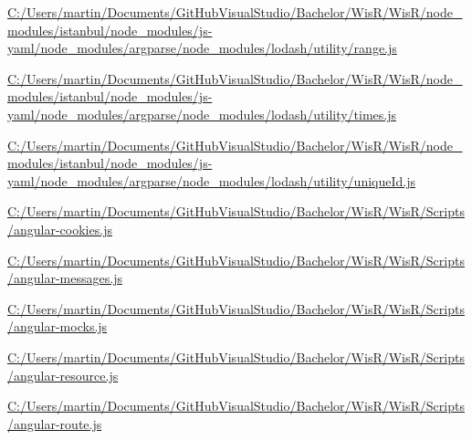 \begin{DoxyCompactItemize}
\item 
\hyperlink{_c_1_2_users_2martin_2_documents_2_git_hub_visual_studio_2_bachelor_2_wis_r_2_wis_r_2node_module2ee5492b139b46c7128e2f7da891638a}{C\+:/\+Users/martin/\+Documents/\+Git\+Hub\+Visual\+Studio/\+Bachelor/\+Wis\+R/\+Wis\+R/node\+\_\+modules/istanbul/node\+\_\+modules/js-\/yaml/node\+\_\+modules/argparse/node\+\_\+modules/lodash/utility/range.\+js}
\item 
\hyperlink{_c_1_2_users_2martin_2_documents_2_git_hub_visual_studio_2_bachelor_2_wis_r_2_wis_r_2node_module51c593bd245b7f2bab7580bd1bfdba2a}{C\+:/\+Users/martin/\+Documents/\+Git\+Hub\+Visual\+Studio/\+Bachelor/\+Wis\+R/\+Wis\+R/node\+\_\+modules/istanbul/node\+\_\+modules/js-\/yaml/node\+\_\+modules/argparse/node\+\_\+modules/lodash/utility/times.\+js}
\item 
\hyperlink{_c_1_2_users_2martin_2_documents_2_git_hub_visual_studio_2_bachelor_2_wis_r_2_wis_r_2node_module4ecbb4ec0681997d0f9bff42112b07a6}{C\+:/\+Users/martin/\+Documents/\+Git\+Hub\+Visual\+Studio/\+Bachelor/\+Wis\+R/\+Wis\+R/node\+\_\+modules/istanbul/node\+\_\+modules/js-\/yaml/node\+\_\+modules/argparse/node\+\_\+modules/lodash/utility/unique\+Id.\+js}
\item 
\hyperlink{_c_1_2_users_2martin_2_documents_2_git_hub_visual_studio_2_bachelor_2_wis_r_2_wis_r_2_scripts_2angular-cookies_8js-example}{C\+:/\+Users/martin/\+Documents/\+Git\+Hub\+Visual\+Studio/\+Bachelor/\+Wis\+R/\+Wis\+R/\+Scripts/angular-\/cookies.\+js}
\item 
\hyperlink{_c_1_2_users_2martin_2_documents_2_git_hub_visual_studio_2_bachelor_2_wis_r_2_wis_r_2_scripts_2angular-messages_8js-example}{C\+:/\+Users/martin/\+Documents/\+Git\+Hub\+Visual\+Studio/\+Bachelor/\+Wis\+R/\+Wis\+R/\+Scripts/angular-\/messages.\+js}
\item 
\hyperlink{_c_1_2_users_2martin_2_documents_2_git_hub_visual_studio_2_bachelor_2_wis_r_2_wis_r_2_scripts_2angular-mocks_8js-example}{C\+:/\+Users/martin/\+Documents/\+Git\+Hub\+Visual\+Studio/\+Bachelor/\+Wis\+R/\+Wis\+R/\+Scripts/angular-\/mocks.\+js}
\item 
\hyperlink{_c_1_2_users_2martin_2_documents_2_git_hub_visual_studio_2_bachelor_2_wis_r_2_wis_r_2_scripts_2angular-resource_8js-example}{C\+:/\+Users/martin/\+Documents/\+Git\+Hub\+Visual\+Studio/\+Bachelor/\+Wis\+R/\+Wis\+R/\+Scripts/angular-\/resource.\+js}
\item 
\hyperlink{_c_1_2_users_2martin_2_documents_2_git_hub_visual_studio_2_bachelor_2_wis_r_2_wis_r_2_scripts_2angular-route_8js-example}{C\+:/\+Users/martin/\+Documents/\+Git\+Hub\+Visual\+Studio/\+Bachelor/\+Wis\+R/\+Wis\+R/\+Scripts/angular-\/route.\+js}

\end{DoxyCompactItemize}

